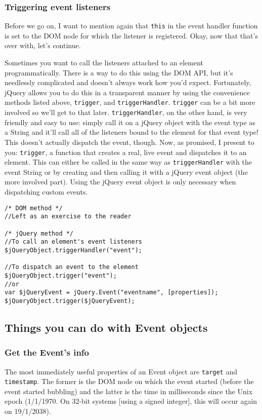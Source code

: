 \documentclass[12pt]{article}
\begin{document}
\subsubsection*{Triggering event listeners}
Before we go on, I want to mention again that \texttt{this} in the event handler function is set to the DOM node for which the listener is registered. Okay, now that that's over with, let's continue.
\par
Sometimes you want to call the listeners attached to an element programmatically. There is a way to do this using the DOM API, but it's needlessly complicated and doesn't always work how you'd expect. Fortunately, jQuery allows you to do this in a transparent manner by using the convenience methods listed above, \texttt{trigger}, and \texttt{triggerHandler}. \texttt{trigger} can be a bit more involved so we'll get to that later. \texttt{triggerHandler}, on the other hand, is very friendly and easy to use: simply call it on a jQuery object with the event type as a String and it'll call all of the listeners bound to the element for that event type! This doesn't actually dispatch the event, though. Now, as promised, I present to you: \texttt{trigger}, a function that creates a real, live event and dispatches it to an element. This can either be called in the same way as \texttt{triggerHandler} with the event String or by creating and then calling it with a jQuery event object (the more involved part). Using the jQuery event object is only necessary when dispatching custom events.
\begin{Verbatim}[frame=single]
/* DOM method */
//Left as an exercise to the reader

/* jQuery method */
//To call an element's event listeners
$jQueryObject.triggerHandler("event");

//To dispatch an event to the element
$jQueryObject.trigger("event");
//or
var $jQueryEvent = jQuery.Event("eventname", [properties]);
$jQueryObject.trigger($jQueryEvent);
\end{Verbatim}

\subsection{Things you can do with Event objects}
\subsubsection*{Get the Event's info}
The most immediately useful properties of an Event object are \texttt{target} and \texttt{timestamp}. The former is the DOM node on which the event started (before the event started bubbling) and the latter is the time in milliseconds since the Unix epoch (1/1/1970. On 32-bit systems [using a signed integer], this will occur again on 19/1/2038).
\end{document}
